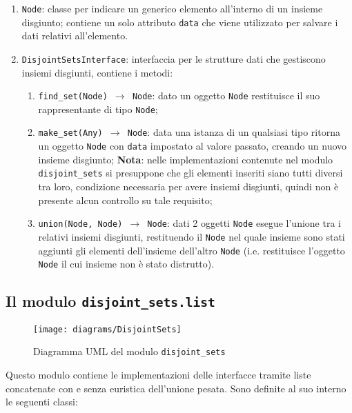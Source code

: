 \begin{enumerate}
      \item \texttt{Node}: classe per indicare un generico elemento all'interno di un insieme
            disgiunto; contiene un solo attributo \texttt{data} che viene utilizzato per salvare i
            dati relativi all'elemento.
      \item \texttt{DisjointSetsInterface}: interfaccia per le strutture dati che gestiscono
            insiemi disgiunti, contiene i metodi:
            \begin{enumerate}
                  \item \texttt{find\_set(Node) $\rightarrow$ Node}: dato un oggetto \texttt{Node} restituisce il suo rappresentante
                        di tipo \texttt{Node};
                  \item \texttt{make\_set(Any) $\rightarrow$ Node}: data una istanza di un qualsiasi tipo ritorna un oggetto \texttt{Node}
                        con \texttt{data} impostato al valore passato, creando un nuovo insieme disgiunto;
                        \textbf{Nota}: nelle implementazioni contenute nel modulo \texttt{disjoint\_sets} si presuppone che gli elementi
                        inseriti siano tutti diversi tra loro, condizione necessaria per avere insiemi disgiunti, quindi non è presente
                        alcun controllo su tale requisito;
                  \item \texttt{union(Node, Node) $\rightarrow$ Node}: dati 2 oggetti \texttt{Node} esegue l'unione tra i relativi insiemi
                        disgiunti, restituendo il \texttt{Node} nel quale insieme sono stati aggiunti gli elementi dell'insieme
                        dell'altro \texttt{Node} (i.e. restituisce l'oggetto \texttt{Node} il cui insieme non è stato distrutto).
            \end{enumerate}
\end{enumerate}

\subsection{Il modulo \texttt{disjoint\_sets.list}}

\begin{figure}[!b]
      \centering
      \texttt{[image: diagrams/DisjointSets]}
      \caption{Diagramma UML del modulo \texttt{disjoint\_sets}}
\end{figure}

Questo modulo contiene le implementazioni delle interfacce tramite liste concatenate con
e senza euristica dell'unione pesata. Sono definite al suo interno le seguenti classi:

